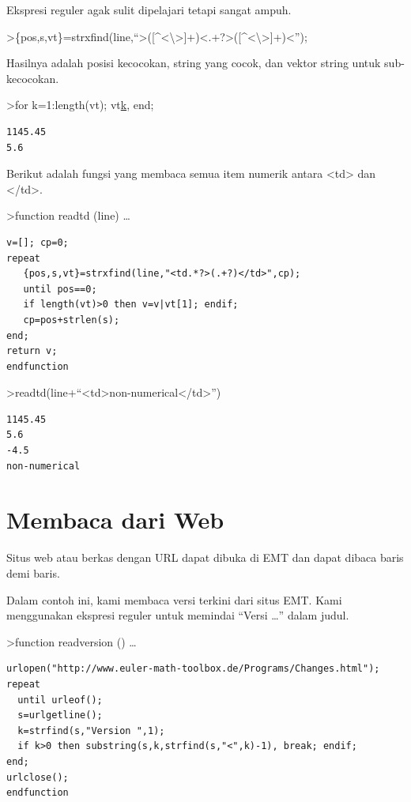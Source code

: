 \documentclass[
]{book}
\begin{document}
Ekspresi reguler agak sulit dipelajari tetapi sangat ampuh.

\textgreater\{pos,s,vt\}=strxfind(line,``\textgreater({[}\^{}\textless\textbackslash\textgreater{]}+)\textless.+?\textgreater({[}\^{}\textless\textbackslash\textgreater{]}+)\textless{}'');

Hasilnya adalah posisi kecocokan, string yang cocok, dan vektor string untuk sub-kecocokan.

\textgreater for k=1:length(vt); vt\href{}{k}, end;

\begin{verbatim}
1145.45
5.6
\end{verbatim}

Berikut adalah fungsi yang membaca semua item numerik antara \textless td\textgreater{} dan \textless/td\textgreater.

\textgreater function readtd (line) \ldots{}

\begin{verbatim}
v=[]; cp=0;
repeat
   {pos,s,vt}=strxfind(line,"<td.*?>(.+?)</td>",cp);
   until pos==0;
   if length(vt)>0 then v=v|vt[1]; endif;
   cp=pos+strlen(s);
end;
return v;
endfunction
\end{verbatim}

\textgreater readtd(line+``\textless td\textgreater non-numerical\textless/td\textgreater{}'')

\begin{verbatim}
1145.45
5.6
-4.5
non-numerical
\end{verbatim}

\section{Membaca dari Web}\label{membaca-dari-web}

Situs web atau berkas dengan URL dapat dibuka di EMT dan dapat dibaca baris demi baris.

Dalam contoh ini, kami membaca versi terkini dari situs EMT. Kami menggunakan ekspresi reguler untuk memindai ``Versi \ldots{}'' dalam judul.

\textgreater function readversion () \ldots{}

\begin{verbatim}
urlopen("http://www.euler-math-toolbox.de/Programs/Changes.html");
repeat
  until urleof();
  s=urlgetline();
  k=strfind(s,"Version ",1);
  if k>0 then substring(s,k,strfind(s,"<",k)-1), break; endif;
end;
urlclose();
endfunction
\end{verbatim}
\end{document}
